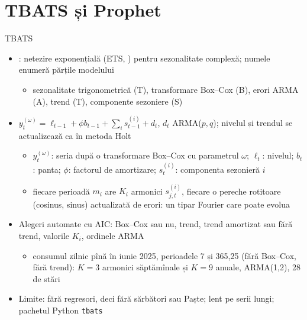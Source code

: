 \section{TBATS și Prophet}

\begin{frame}{TBATS}
\itemsize{\footnotesize}
\begin{itemize}
    \item {}: netezire exponențială (ETS, ) pentru sezonalitate complexă; numele enumeră părțile modelului
    \begin{itemize}
        \item sezonalitate trigonometrică (T), transformare Box--Cox (B), erori ARMA (A), trend (T), componente sezoniere (S)
    \end{itemize}
    \item $y_t^{(\omega)} = \ell_{t-1} + \phi b_{t-1} + \sum_{i}s^{(i)}_{t-1} + d_t$, $d_t$ ARMA($p,q$); nivelul și trendul se actualizează ca în metoda Holt
    \begin{itemize}
        \item $y_t^{(\omega)}$: seria după o transformare Box--Cox cu parametrul $\omega$; $\ell_t$: nivelul; $b_t$: panta; $\phi$: factorul de amortizare; $s^{(i)}_t$: componenta sezonieră $i$
        \item fiecare perioadă $m_i$ are $K_i$ armonici $s^{(i)}_{j,t}$, fiecare o pereche rotitoare (cosinus, sinus) actualizată de erori: un tipar Fourier care poate evolua
    \end{itemize}
    \item Alegeri automate cu AIC: Box--Cox sau nu, trend, trend amortizat sau fără trend, valorile $K_i$, ordinele ARMA
    \begin{itemize}
        \item consumul zilnic pînă în iunie 2025, perioadele 7 și 365,25 (fără Box--Cox, fără trend): $K = 3$ armonici săptămînale și $K = 9$ anuale, ARMA(1,2), 28 de stări
    \end{itemize}
    \item Limite: fără regresori, deci fără sărbători sau Paște; lent pe serii lungi; pachetul Python \texttt{tbats}
\end{itemize}
\end{frame}

